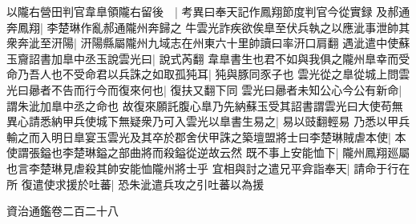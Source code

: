 以隴右營田判官韋臯領隴右留後　|{
	考異曰奉天記作鳳翔節度判官今從實録}
及郝通奔鳳翔|{
	李楚琳作亂郝通隴州奔歸之}
牛雲光詐疾欲俟臯至伏兵執之以應泚事泄帥其衆奔泚至汧陽|{
	汧陽縣屬隴州九域志在州東六十里帥讀曰率汧口肩翻}
遇泚遣中使蘇玉齎詔書加臯中丞玉說雲光曰|{
	說式芮翻}
韋臯書生也君不如與我俱之隴州臯幸而受命乃吾人也不受命君以兵誅之如取孤㹠耳|{
	㹠與豚同豕子也}
雲光從之臯從城上問雲光曰曏者不告而行今而復來何也|{
	復扶又翻下同}
雲光曰曏者未知公心今公有新命|{
	謂朱泚加臯中丞之命也}
故復來願託腹心臯乃先納蘇玉受其詔書謂雲光曰大使苟無異心請悉納甲兵使城下無疑衆乃可入雲光以臯書生易之|{
	易以豉翻輕易}
乃悉以甲兵輸之而入明日臯宴玉雲光及其卒於郡舍伏甲誅之築壇盟將士曰李楚琳賊虐本使|{
	本使謂張鎰也李楚琳鎰之部曲將而殺鎰從逆故云然}
既不事上安能恤下|{
	隴州鳳翔廵屬也言李楚琳見虐殺其帥安能恤隴州將士乎}
宜相與討之遣兄平弇詣奉天|{
	請命于行在所}
復遣使求援於吐蕃|{
	恐朱泚遣兵攻之引吐蕃以為援}


資治通鑑卷二百二十八
